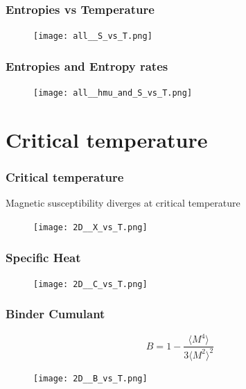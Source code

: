 \documentclass{beamer}
\begin{document}

\begin{frame}
\frametitle{Entropies vs Temperature}

\begin{figure}
\texttt{[image: all\_\_S\_vs\_T.png]}
\end{figure}

\end{frame}


\begin{frame}
\frametitle{Entropies and Entropy rates}

\begin{figure}
\texttt{[image: all\_\_hmu\_and\_S\_vs\_T.png]}
\end{figure}

\end{frame}

\section{Critical temperature}

\begin{frame}
\frametitle{Critical temperature}

Magnetic susceptibility diverges at critical temperature

\begin{figure}
\texttt{[image: 2D\_\_X\_vs\_T.png]}
\end{figure}

\end{frame}


\begin{frame}
\frametitle{Specific Heat}

\begin{figure}
\texttt{[image: 2D\_\_C\_vs\_T.png]}
\end{figure}

\end{frame}


\begin{frame}
\frametitle{Binder Cumulant}

$$ B = 1 - \frac{\langle M^4 \rangle}{3 \langle M^2 \rangle ^2} $$

\begin{figure}
\texttt{[image: 2D\_\_B\_vs\_T.png]}
\end{figure}

\end{frame}
\end{document}
